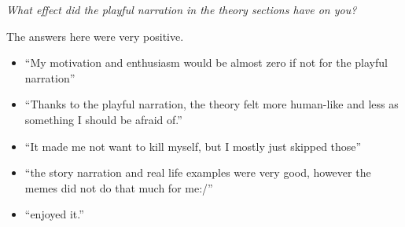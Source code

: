 \textit{What effect did the playful narration in the theory sections have on you?}

The answers here were very positive. 

\begin{itemize}
    \item \enquote{My motivation and enthusiasm would be almost zero if not for the playful narration}
    \item \enquote{Thanks to the playful narration, the theory felt more human-like and less as something I should be afraid of.}
    \item \enquote{It made me not want to kill myself, but I mostly just skipped those}
    \item \enquote{the story narration and real life examples were very good, however the memes did not do that much for me:/}
    \item \enquote{enjoyed it.}
\end{itemize}